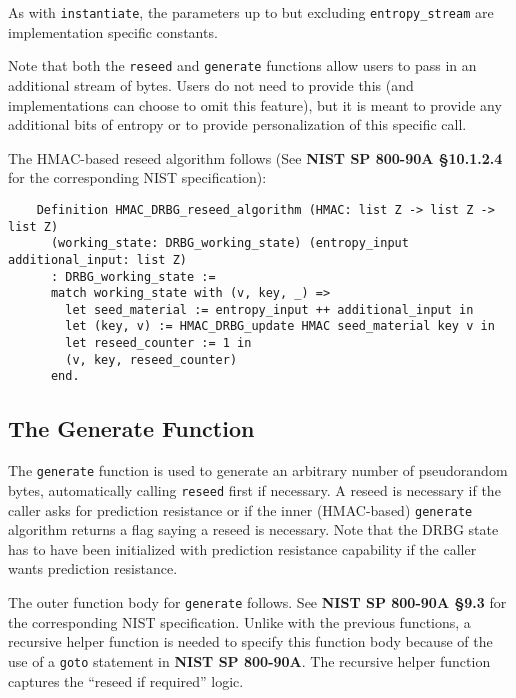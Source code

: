 \documentclass[pageno]{jpaper}
\newcommand{\stdtitle}[1]{\textbf{#1}}
\begin{document}
As with \lstinline{instantiate}, the parameters up to but excluding \lstinline{entropy_stream} are implementation specific constants.

Note that both the \lstinline{reseed} and \lstinline{generate} functions allow users to pass in an additional stream of bytes. Users do not need to provide this (and implementations can choose to omit this feature), but it is meant to provide any additional bits of entropy or to provide personalization of this specific call.

The HMAC-based reseed algorithm follows (See \stdtitle{NIST SP 800-90A \S 10.1.2.4} for the corresponding NIST specification):

\begin{lstlisting}
    Definition HMAC_DRBG_reseed_algorithm (HMAC: list Z -> list Z -> list Z)
      (working_state: DRBG_working_state) (entropy_input additional_input: list Z)
      : DRBG_working_state :=
      match working_state with (v, key, _) =>
        let seed_material := entropy_input ++ additional_input in
        let (key, v) := HMAC_DRBG_update HMAC seed_material key v in
        let reseed_counter := 1 in
        (v, key, reseed_counter)
      end.
\end{lstlisting}

\subsection{The Generate Function} \label{funcgenerate}
The \lstinline{generate} function is used to generate an arbitrary number of pseudorandom bytes, automatically calling \lstinline{reseed} first if necessary. A reseed is necessary if the caller asks for prediction resistance or if the inner (HMAC-based) \lstinline{generate} algorithm returns a flag saying a reseed is necessary. Note that the DRBG state has to have been initialized with prediction resistance capability if the caller wants prediction resistance.

The outer function body for \lstinline{generate} follows. See \stdtitle{NIST SP 800-90A \S 9.3} for the corresponding NIST specification. Unlike with the previous functions, a recursive helper function is needed to specify this function body because of the use of a \lstinline{goto} statement in \stdtitle{NIST SP 800-90A}. The recursive helper function captures the “reseed if required” logic.
\end{document}
